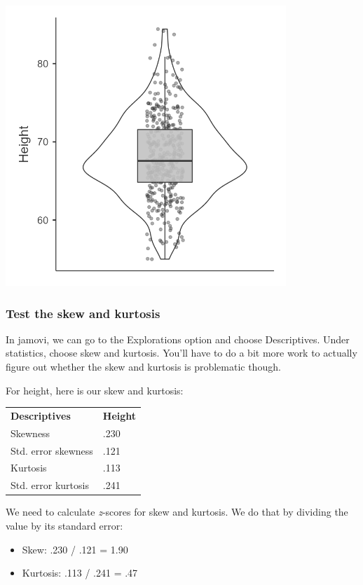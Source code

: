 \documentclass[
]{book}
\begin{document}
\includegraphics[width=4.16667in,height=\textheight]{images/06-inferential/boxplot.png}

\hypertarget{test-the-skew-and-kurtosis}{%
\subsubsection{Test the skew and kurtosis}\label{test-the-skew-and-kurtosis}}

In jamovi, we can go to the Explorations option and choose Descriptives. Under statistics, choose skew and kurtosis. You'll have to do a bit more work to actually figure out whether the skew and kurtosis is problematic though.

For height, here is our skew and kurtosis:

\begin{longtable}[]{@{}ll@{}}
\toprule
& \\
\midrule
\endhead
\textbf{Descriptives} & \textbf{Height} \\
Skewness & .230 \\
Std. error skewness & .121 \\
Kurtosis & .113 \\
Std. error kurtosis & .241 \\
\bottomrule
\end{longtable}

We need to calculate \emph{z}-scores for skew and kurtosis. We do that by dividing the value by its standard error:

\begin{itemize}
\item
  Skew: .230 / .121 = 1.90
\item
  Kurtosis: .113 / .241 = .47
\end{itemize}
\end{document}
